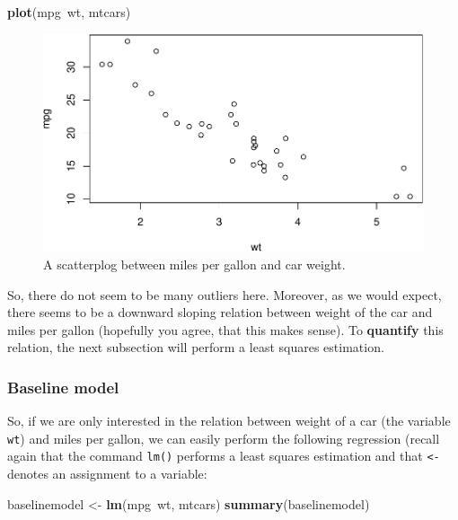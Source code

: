 \documentclass[]{article}
\newenvironment{Shaded}{\begin{snugshade}}{\end{snugshade}}
\newcommand{\KeywordTok}[1]{\textcolor[rgb]{0.13,0.29,0.53}{\textbf{{#1}}}}
\newcommand{\StringTok}[1]{\textcolor[rgb]{0.31,0.60,0.02}{{#1}}}
\newcommand{\NormalTok}[1]{{#1}}
\theoremstyle{definition}
\theoremstyle{definition}
\theoremstyle{definition}
\theoremstyle{remark}
\begin{document}
\begin{Shaded}
\begin{Highlighting}[]
\KeywordTok{plot}\NormalTok{(mpg~wt, mtcars)}
\end{Highlighting}
\end{Shaded}

\begin{figure}[htbp]
\centering
\includegraphics{./unnamed-chunk-34-1.pdf}
\caption{\label{fig:unnamed-chunk-34}A scatterplog between miles per gallon
and car weight.}
\end{figure}

So, there do not seem to be many outliers here. Moreover, as we would
expect, there seems to be a downward sloping relation between weight of
the car and miles per gallon (hopefully you agree, that this makes
sense). To \textbf{quantify} this relation, the next subsection will
perform a least squares estimation.

\subsubsection{Baseline model}\label{baseline-model}

So, if we are only interested in the relation between weight of a car
(the variable \texttt{wt}) and miles per gallon, we can easily perform
the following regression (recall again that the command \texttt{lm()}
performs a least squares estimation and that \texttt{\textless{}-}
denotes an assignment to a variable:

\begin{Shaded}
\begin{Highlighting}[]
\NormalTok{baselinemodel <-}\StringTok{ }\KeywordTok{lm}\NormalTok{(mpg~wt, mtcars)}
\KeywordTok{summary}\NormalTok{(baselinemodel)}
\end{Highlighting}
\end{Shaded}
\end{document}
